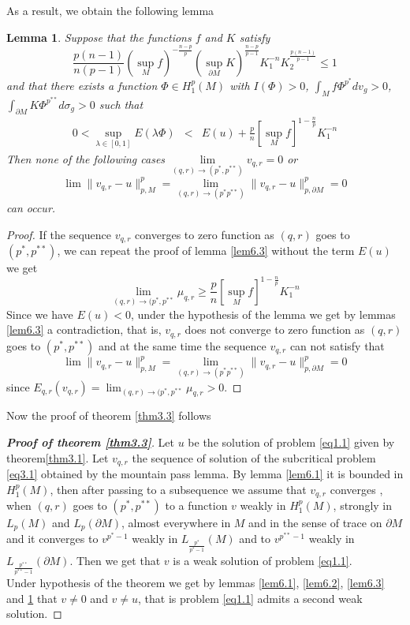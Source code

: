 \documentclass{Tran-l}
\newtheorem{lem}[thm]{Lemma}
\theoremstyle{definition}
\theoremstyle{remark}
\numberwithin{equation}{section}
\begin{document}
As a result, we obtain the following lemma
\begin{lem}\label{lem6.4}
Suppose that the functions $f$ and $K$ satisfy
\begin{equation*}
\frac{p(n-1)}{n(p-1)}(\sup_Mf)^{-\frac{n-p}{p}}(\sup_{\partial
M}K)^\frac{n-p}{p-1}K_1^{-n}K_2^{\frac{p(n-1)}{p-1}}\le1
\end{equation*}
 and that there exists a function $\Phi\in H^p_1(M)$ with
 $I(\Phi)>0$, $\int_Mf\Phi^{p^*}dv_g>0$, $\int_{\partial
M}K\Phi^{p^{**}}d\sigma_g>0$ such that
\begin{eqnarray*}
  0<\underset{\lambda\in[0,1]}\sup E(\lambda\Phi) &<&
E(u)+\frac{p}{n}\left[\sup_Mf\right]^{1-\frac{n}{p}}K_1^{-n}
\end{eqnarray*}
Then none of the following cases
$\underset{(q,r)\rightarrow(p^*,p^{**})}\lim v_{q,r}=0$ or
\begin{equation*}
\lim \|v_{q,r}-u\|_{p,M}^p=\underset{(q,r)\rightarrow(p^*p^{**})}
\lim\|v_{q,r}-u\|_{p,\partial M}^p=0
\end{equation*}
 can occur.
\end{lem}
\begin{proof} If the sequence $v_{q,r}$ converges to zero function as $(q,r)$ goes to
$(p^*,p^{**})$, we can repeat the proof of lemma \ref{lem6.3}
without the term $E(u)$ we get
\begin{equation*}
\lim_{(q,r)\to(p^*,p^{**}}\mu_{q,r}\ge
\frac{p}{n}\left[\sup_Mf\right]^{1-\frac{n}{p}}K_1^{-n}
\end{equation*}
Since we have $E(u)<0$, under the hypothesis of the lemma  we get by
lemmas \ref{lem6.3} a contradiction, that is, $v_{q,r}$ does not
converge to zero function as $(q,r)$ goes to $(p^*,p^{**})$ and at
the same time the sequence $v_{q,r}$ can not satisfy that
\begin{equation*} \lim
\|v_{q,r}-u\|_{p,M}^p=\underset{(q,r)\rightarrow(p^*p^{**})}
\lim\|v_{q,r}-u\|_{p,\partial M}^p=0
\end{equation*}  since
$E_{q,r}(v_{q,r})=\lim_{(q,r)\to(p^*,p^{**}}\mu_{q,r}>0$.
\end{proof}
 Now the proof of theorem \ref{thm3.3} follows
\begin{proof}[\textbf{Proof of theorem \ref{thm3.3}}] Let $u$ be
the solution of problem \eqref{eq1.1} given by theorem\ref{thm3.1}.
Let $v_{q,r}$ the sequence of solution of the subcritical problem
\eqref{eq3.1} obtained by the mountain pass lemma. By lemma
\ref{lem6.1} it is bounded in $H^p_1(M)$, then after passing to a
subsequence we assume that $v_{q,r}$ converges , when $(q,r)$ goes
to $(p^*,p^{**})$ to a function $v$ weakly in $H^p_1(M)$, strongly
in $L_p(M)$ and $L_p(\partial M)$, almost everywhere in $M$ and in
the sense of trace on $\partial M$ and it converges to $v^{p^*-1}$
weakly in $L_{\frac{p^*}{p^*-1}}(M)$ and to $v^{p^{**}-1}$ weakly in
$L_{\frac{p^{**}}{p^{**}-1}}(\partial M)$.
Then we get that $v$ is a weak solution of problem \eqref{eq1.1}.\\
Under hypothesis of the theorem  we get by lemmas \ref{lem6.1},
\ref{lem6.2}, \ref{lem6.3} and \ref{lem6.4}  that $v\neq0$ and
$v\neq u$, that is problem \eqref{eq1.1} admits a second weak
solution.
\end{proof}
\end{document}
